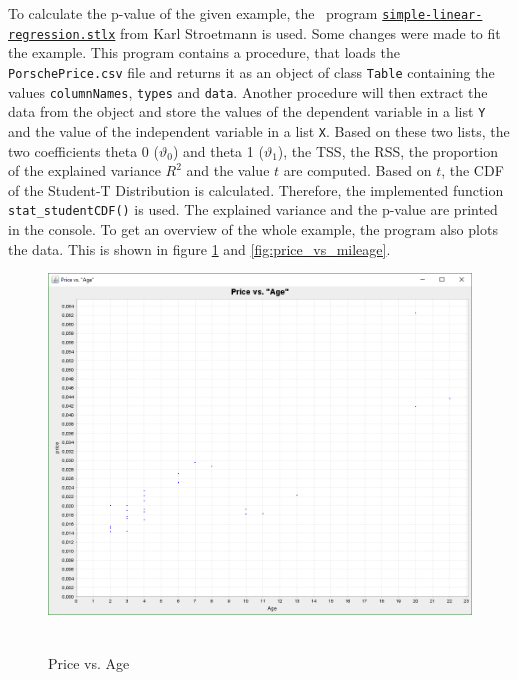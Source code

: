 	To calculate the p-value of the given example, the \setlx\ program \href{https://raw.githubusercontent.com/karlstroetmann/Artificial-Intelligence/master/SetlX/simple-linear-regression.stlx}{\lstinline{simple-linear-regression.stlx}} from Karl Stroetmann is used. Some changes were made to fit the example. This program contains a procedure, that loads the \lstinline{PorschePrice.csv} file and returns it as an object of class \lstinline{Table} containing the values \lstinline{columnNames}, \lstinline{types} and \lstinline{data}. Another procedure will then extract the data from the object and store the values of the dependent variable in a list \lstinline{Y} and the value of the independent variable in a list \lstinline{X}. Based on these two lists, the two coefficients theta 0 ($\vartheta _0$) and theta 1 ($\vartheta _1$), the \ac{TSS}, the \ac{RSS}, the proportion of the explained variance $R^{2}$ and the value $t$ are computed. Based on $t$, the \ac{CDF} of the Student-T Distribution is calculated. Therefore, the implemented function \lstinline{stat_studentCDF()} is used. The explained variance and the p-value are printed in the console. To get an overview of the whole example, the program also plots the data. This is shown in figure \ref{fig:price_vs_age} and \ref{fig:price_vs_mileage}.

	\begin{figure}[h]
		\centering
		\includegraphics[width=1\textwidth]{Figures/price_vs_age}~\\
		\caption{Price vs. Age}
		\label{fig:price_vs_age}
	\end{figure}


